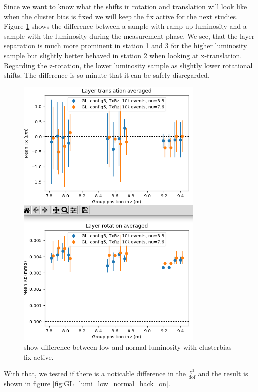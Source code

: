 Since we want to know what the shifts in rotation and translation will look like when the cluster bias is fixed we will keep the fix active for the next studies.
Figure \ref{fig:lumi_low_normal_hack_on} shows the difference between a sample with ramp-up luminosity and a sample with the luminosity during the measurement phase.
We see, that the layer separation is much more prominent in station 1 and 3 for the higher luminosity sample but slightly better behaved in station 2 when looking at x-translation.
Regarding the z-rotation, the lower luminosity sample as slightly lower rotational shifts.
The difference is so minute that it can be safely disregarded.

\begin{figure}
  \centering
  \includegraphics[width=0.8\textwidth]{plots/jan_24_2022/low_normal_with_hack.png}
  \caption{show difference between low and normal luminosity with clusterbias fix active.}
  \label{fig:lumi_low_normal_hack_on}
\end{figure}

With that, we tested if there is a noticable difference in the $\frac{\chi^2}{\text{dof}}$
and the result is shown in figure \ref{fig:GL_lumi_low_normal_hack_on}.

